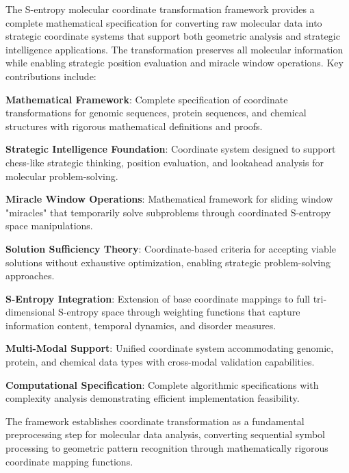 \documentclass[12pt,a4paper]{article}
\begin{document}
The S-entropy molecular coordinate transformation framework provides a complete mathematical specification for converting raw molecular data into strategic coordinate systems that support both geometric analysis and strategic intelligence applications. The transformation preserves all molecular information while enabling strategic position evaluation and miracle window operations. Key contributions include:

\textbf{Mathematical Framework}: Complete specification of coordinate transformations for genomic sequences, protein sequences, and chemical structures with rigorous mathematical definitions and proofs.

\textbf{Strategic Intelligence Foundation}: Coordinate system designed to support chess-like strategic thinking, position evaluation, and lookahead analysis for molecular problem-solving.

\textbf{Miracle Window Operations}: Mathematical framework for sliding window "miracles" that temporarily solve subproblems through coordinated S-entropy space manipulations.

\textbf{Solution Sufficiency Theory}: Coordinate-based criteria for accepting viable solutions without exhaustive optimization, enabling strategic problem-solving approaches.

\textbf{S-Entropy Integration}: Extension of base coordinate mappings to full tri-dimensional S-entropy space through weighting functions that capture information content, temporal dynamics, and disorder measures.

\textbf{Multi-Modal Support}: Unified coordinate system accommodating genomic, protein, and chemical data types with cross-modal validation capabilities.

\textbf{Computational Specification}: Complete algorithmic specifications with complexity analysis demonstrating efficient implementation feasibility.

The framework establishes coordinate transformation as a fundamental preprocessing step for molecular data analysis, converting sequential symbol processing to geometric pattern recognition through mathematically rigorous coordinate mapping functions.
\end{document}
